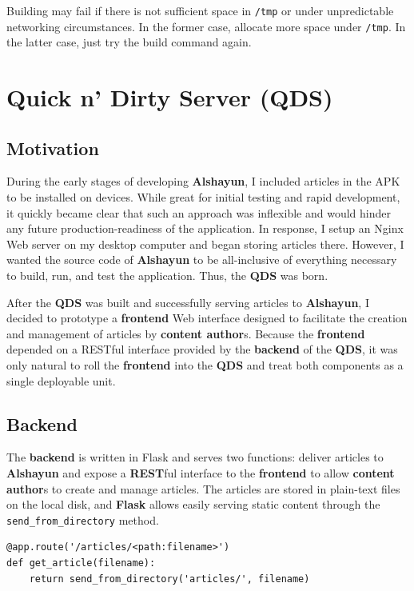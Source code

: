 \documentclass[12pt]{report}
\begin{document}
Building may fail if there is not sufficient space in \texttt{/tmp} or under
unpredictable networking circumstances. In the former case, allocate more space
under \texttt{/tmp}. In the latter case, just try the build command again.

\chapter{Quick n' Dirty Server (QDS)}

    \section{Motivation}

During the early stages of developing \textbf{Alshayun}, I included articles in
the APK to be installed on devices. While great for initial testing and rapid
development, it quickly became clear that such an approach was inflexible and
would hinder any future production-readiness of the application. In response, I
setup an Nginx Web server on my desktop computer and began storing articles
there. However, I wanted the source code of \textbf{Alshayun} to be
all-inclusive of everything necessary to build, run, and test the application.
Thus, the \textbf{QDS} was born.

After the \textbf{QDS} was built and successfully serving articles to
\textbf{Alshayun}, I decided to prototype a \textbf{frontend} Web interface
designed to facilitate the creation and management of articles by
\textbf{content author}s. Because the \textbf{frontend} depended on a RESTful
interface provided by the \textbf{backend} of the \textbf{QDS}, it was only
natural to roll the \textbf{frontend} into the \textbf{QDS} and treat both
components as a single deployable unit.

    \section{Backend}

The \textbf{backend} is written in Flask and serves two functions: deliver
articles to \textbf{Alshayun} and expose a \textbf{REST}ful interface to the
\textbf{frontend} to allow \textbf{content author}s to create and manage
articles. The articles are stored in plain-text files on the local disk, and
\textbf{Flask} allows easily serving static content through the
\texttt{send\_from\_directory} method.

\begin{verbatim}
@app.route('/articles/<path:filename>')
def get_article(filename):
    return send_from_directory('articles/', filename)
\end{verbatim}
\end{document}
